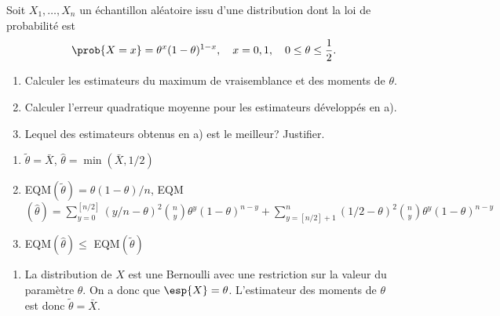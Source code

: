 \begin{exercice}
  Soit $X_1, \dots, X_n$ un échantillon aléatoire issu d'une
  distribution dont la loi de probabilité est
  \begin{displaymath}
    \prob{X = x} = \theta^x (1 - \theta)^{1 - x}, \quad x = 0, 1,
    \quad 0 \leq \theta \leq \frac{1}{2}.
  \end{displaymath}
  \begin{enumerate}
  \item Calculer les estimateurs du maximum de vraisemblance et des
    moments de $\theta$.
  \item Calculer l'erreur quadratique moyenne pour les estimateurs
    développés en a).
  \item Lequel des estimateurs obtenus en a) est le meilleur?
    Justifier.
  \end{enumerate}
  \begin{rep}
    \begin{enumerate}
    \item $\tilde{\theta} = \bar{X}$, $\hat{\theta} =
      \min(\bar{X}, 1/2)$
    \item EQM$(\tilde{\theta}) = \theta (1 - \theta)/n$,
      EQM$(\hat{\theta}) =
      \sum_{y = 0}^{[n/2]} (y/n - \theta)^2 \binom{n}{y} \theta^y (1 -
      \theta)^{n-y} + \sum_{y = [n/2] + 1}^n (1/2 - \theta)^2
      \binom{n}{y} \theta^y (1 - \theta)^{n - y}$
    \item EQM$(\hat{\theta}) \leq$ EQM$(\tilde{\theta})$
    \end{enumerate}
  \end{rep}
  \begin{sol}
    \begin{enumerate}
    \item La distribution de $X$ est une Bernoulli avec une
      restriction sur la valeur du paramètre $\theta$. On a donc que
      $\esp{X} = \theta$. L'estimateur des moments de $\theta$ est
      donc $\tilde{\theta} = \bar{X}$.


\end{enumerate}
\end{sol}
\end{exercice}
